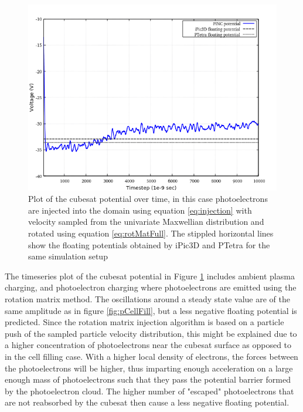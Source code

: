 \begin{figure}[H]
    \centering
    \includegraphics[scale=0.4]{figures/DECA/PhotoelectronInjectionByRotationMatrix/pRotMat.png}
    \caption{Plot of the cubesat potential over time, in this case photoelectrons are injected into the domain using equation \eqref{eq:injection} with velocity sampled from the univariate Maxwellian distribution and rotated using equation \eqref{eq:rotMatFull}. The stippled horizontal lines show the floating potentials obtained by iPic3D and PTetra for the same simulation setup}
    \captionsetup{belowskip=5pt}
    \label{fig:pRotMat}
\end{figure}

The timeseries plot of the cubesat potential in Figure \ref{fig:pRotMat} includes ambient plasma charging, and photoelectron charging where photoelectrons are emitted using the rotation matrix method. The oscillations around a steady state value are of the same amplitude as in figure \ref{fig:pCellFill}, but a less negative floating potential is predicted. Since the rotation matrix injection algorithm is based on a particle push of the sampled particle velocity distribution, this might be explained due to a higher concentration of photoelectrons near the cubesat surface as opposed to in the cell filling case. With a higher local density of electrons, the forces between the photoelectrons will be higher, thus imparting enough acceleration on a large enough mass of photoelectrons such that they pass the potential barrier formed by the photoelectron cloud. The higher number of "escaped" photoelectrons that are not reabsorbed by the cubesat then cause a less negative floating potential. 


